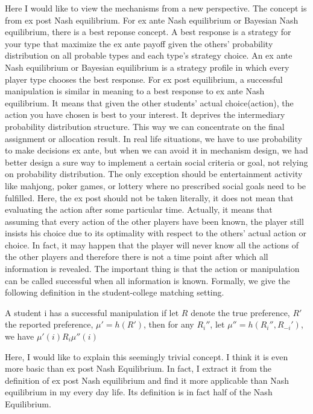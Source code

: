 Here I would like to view the mechanisms from a new perspective. The concept is from ex post Nash equilibrium. For ex ante Nash equilibrium or Bayesian Nash equilibrium, there is a  best reponse concept.
A best response is a strategy for your type that maximize the ex ante payoff given the others' probability distribution on all probable types and each type's strategy choice. An ex ante Nash equilibrium or
Bayesian equilibrium is a strategy profile in which every player type chooses the best response. 
For ex post equilibrium,  a successful manipulation is similar in meaning to a best response to  ex ante Nash equilibrium. It means that given the other students' actual choice(action), the action you have
chosen is best to your interest. It deprives the intermediary probability distribution structure. This way we can concentrate on the final assignment or allocation result. In real life situations, 
we have to use probability to make decisions ex ante, but when we can avoid it in mechanism design, we had better design a sure way to implement a certain social criteria or goal, not relying on 
probability distribution. The only exception should be entertainment activity like mahjong, poker games, or lottery where no prescribed social goals need to be fulfilled. Here, the ex post should not be taken 
literally, it does not mean that 
evaluating the action after some particular time. Actually, it means that assuming that every action of the other players have been known, the player still insists his choice due to its optimality with respect
to the others' actual action or choice. In fact, it may happen that the player will never know all the actions of the other players and therefore there is not a time point after which all information is revealed. 
The important thing is that the action or manipulation can be called successful when all information is known.
Formally, we give the following definition in the student-college matching setting. 
\begin{definition}
A student i has a successful manipulation 
if let $R$ denote the true preference, $R'$ the reported preference, $\mu' = h(R')$, then for any $R_i''$, let $\mu''= h(R_i'',R_{-i}')$, we have  $\mu'(i) R_i \mu''(i)$
\end{definition}

Here, I would like to explain this seemingly trivial concept. I think it is even more basic than ex post Nash Equilibrium. In fact, I extract it from the definition of ex post Nash equilibrium and find it more applicable than Nash equilibrium in my every day life. Its definition is in fact half of the Nash Equilibrium.

